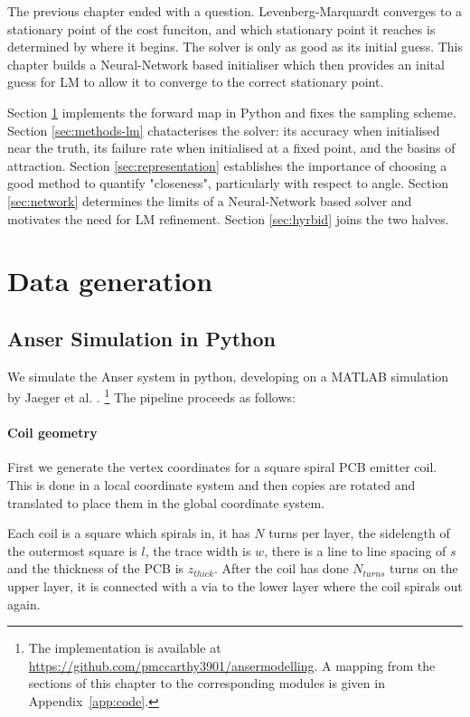\documentclass[12pt,a4paper]{report}
\begin{document}
The previous chapter ended with a question. Levenberg-Marquardt converges to a stationary point of the cost funciton, and which stationary point it reaches is determined by where it begins. The solver is only as good as its initial guess. This chapter builds a Neural-Network based initialiser which then provides an inital guess for LM to allow it to converge to the correct stationary point. 

Section \ref{sec:datagen} implements the forward map in Python and fixes the sampling scheme. Section \ref{sec:methods-lm} chatacterises the solver: its accuracy when initialised near the truth, its failure rate when initialised at a fixed point, and the basins of attraction. Section \ref{sec:representation} establishes the importance of choosing a good method to quantify "closeness", particularly with respect to angle. Section \ref{sec:network} determines the limits of a Neural-Network based solver and motivates the need for LM refinement. Section \ref{sec:hyrbid} joins the two halves. 
\section{Data generation}\label{sec:datagen}
\subsection{Anser Simulation in Python}
We simulate the Anser system in python, developing on a MATLAB simulation by Jaeger et al. \cite{jaeger2017}. \footnote{The implementation is available at
\url{https://github.com/pmccarthy3901/ansermodelling}. A mapping from the
sections of this chapter to the corresponding modules is given in
Appendix~\ref{app:code}.}
The pipeline proceeds as follows:

\paragraph{Coil geometry}
First we generate the vertex coordinates for a square spiral PCB emitter coil. This is done in a local coordinate system and then copies are rotated and translated to place them in the global coordinate system. 

Each coil is a square which spirals in, it has $N$ turns per layer, the sidelength of the outermost square is $l$, the trace width is $w$, there is a line to line spacing of $s$ and the thickness of the PCB is $z_{thick}$. After the coil has done $N_{turns}$ turns on the upper layer, it is connected with a via to the lower layer where the coil spirals out again. 
\end{document}
